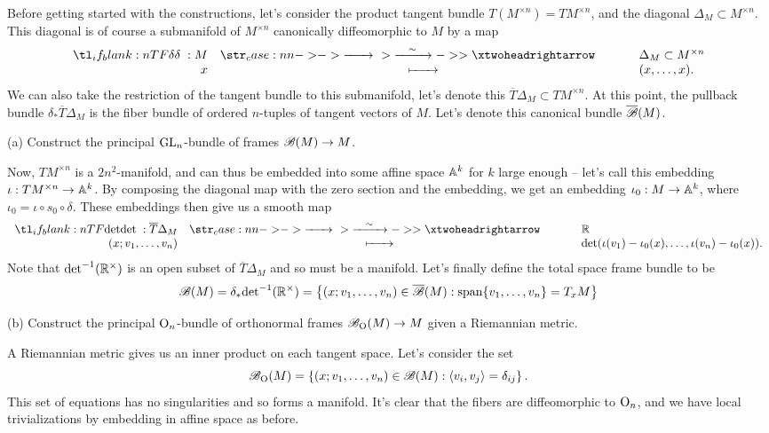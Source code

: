 \documentclass{../../templates/lkx_pset}
\begin{document}
\begin{solution}
	Before getting started with the constructions, let's consider the product tangent bundle $T(M^{\times n})=TM^{\times n}$, and the diagonal $\Delta_M \subset M^{\times n}$. This diagonal is of course a submanifold of $M^{\times n}$ canonically diffeomorphic to $M$ by a map
  \[
    \lkxfunc{\delta}{M}{\Delta_M\subset M^{\times n}}{x}{(x,\ldots, x).}
  \]
	We can also take the restriction of the tangent bundle to this submanifold, let's denote this $\overline{T}\Delta_M \subset TM^{\times n}$. At this point, the pullback bundle $\delta_* \overline{T}\Delta_M$ is the fiber bundle of ordered $n$-tuples of tangent vectors of $M$. Let's denote this canonical bundle $\overline{\mathscr{B}}(M)$.

	\begin{part}{(a)}
		Construct the principal $\operatorname{GL}_n$-bundle of frames $\mathscr{B}(M) \to M$.
	\end{part}



	Now, $TM^{\times n}$ is a $2n^2$-manifold, and can thus be embedded into some affine space $\mathbb{A}^k$ for $k$ large enough -- let's call this embedding $\iota : TM^{\times n} \to \mathbb{A}^k$. By composing the diagonal map with the zero section and the embedding, we get an embedding $\iota_0 : M \to \mathbb{A}^k$, where $\iota_0 = \iota\circ s_0\circ \delta$. These embeddings then give us a smooth map
	\[
    \lkxfunc{\det}{\overline{T}\Delta_M}{\R}{(x; v_1,\ldots, v_n)}{\det(\iota(v_1)-\iota_0(x),\ldots, \iota(v_n)-\iota_0(x)).}
	\]
	Note that $\det^{-1}(\mathbb{R}^\times)$ is an open subset of $\overline{T}\Delta_M$ and so must be a manifold. Let's finally define the total space frame bundle to be
	\[
    \mathscr{B}(M) = \delta_* \textrm{det}^{-1}(\mathbb{R}^\times) = \left\{ (x; v_1,\ldots, v_n)\in \overline{\mathscr{B}}(M) : \textrm{span}\{v_1,\ldots, v_n\} = T_xM\right\}
	\]

	\begin{part}{(b)}
		Construct the principal ${\operatorname{O}}_n$-bundle of orthonormal frames $\mathscr{B}_{\operatorname{O}}(M) \to M$ given a Riemannian metric.
	\end{part}

	A Riemannian metric gives us an inner product on each tangent space. Let's consider the set
	\[
    \mathscr{B}_{\operatorname{O}}(M) = \left\{ (x; v_1,\ldots, v_n) \in \mathscr{B}(M) : \langle v_i, v_j\rangle = \delta_{ij} \right\}.
	\]
	This set of equations has no singularities and so forms a manifold. It's clear that the fibers are diffeomorphic to ${\operatorname{O}}_n$, and we have local trivializations by embedding in affine space as before.
\end{solution}
\end{document}
